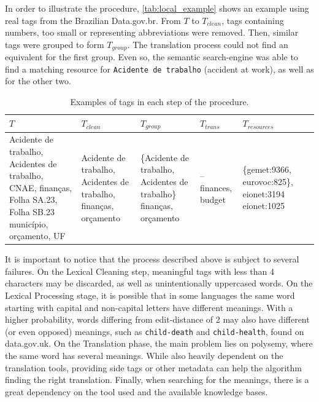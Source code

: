 In order to illustrate the procedure, \autoref{tab:local_example} shows an example using real tags from the Brazilian Data.gov.br.
From $T$ to $T_{clean}$, tags containing numbers, too small or representing abbreviations were removed.
Then, similar tags were grouped to form $T_{group}$.
The translation process could not find an equivalent for the first group.
Even so, the semantic search-engine was able to find a matching resource for \texttt{Acidente de trabalho} (accident at work), as well as for the other two.

\begin{table}[]
\centering
\ABNTEXfontereduzida
\caption{Examples of tags in each step of the procedure.}
\label{tab:local_example}
\begin{tabular}{|p{2cm}|p{2cm}|p{2cm}|p{2cm}|p{2cm}|p{2cm}|}
\hline
$T$ & $T_{clean}$ & $T_{group}$ & $T_{trans}$ & $T_{resources}$ \\ \hline
Acidente de trabalho,
Acidentes de trabalho,
CNAE,
finanças,
Folha SA.23,
Folha SB.23 
município,
orçamento,
UF
&
Acidente de trabalho,
Acidentes de trabalho,
finanças,
orçamento
&
\{Acidente de trabalho, Acidentes de trabalho\}
finanças,
orçamento
&
--
finances,
budget
&
\{gemet:9366, eurovoc:825\},
eionet:3194
eionet:1025 \\ \hline
\end{tabular}
\end{table}

It is important to notice that the process described above is subject to several failures.
On the Lexical Cleaning step, meaningful tags with less than 4 characters may be discarded, as well as unintentionally uppercased words.
On the Lexical Processing stage, it is possible that in some languages the same word starting with capital and non-capital letters have different meanings.
With a higher probability, words differing from edit-distance of 2 may also have different (or even opposed) meanings, such as \texttt{child-death} and \texttt{child-health}, found on data.gov.uk.
On the Translation phase, the main problem lies on polysemy, where the same word has several meanings.
While also heavily dependent on the translation tools, providing side tags or other metadata can help the algorithm finding the right translation.
Finally, when searching for the meanings, there is a great dependency on the tool used and the available knowledge bases.

